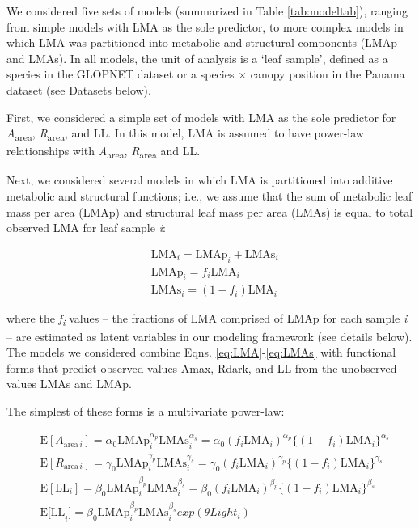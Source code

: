 \documentclass[
  12pt,
]{article}
\begin{document}
We considered five sets of models (summarized in Table \ref{tab:modeltab}), ranging from simple models with LMA as the sole predictor, to more complex models in which LMA was partitioned into metabolic and structural components (LMAp and LMAs).
In all models, the unit of analysis is a `leaf sample', defined as a species in the GLOPNET dataset or a species \(\times\) canopy position in the Panama dataset (see Datasets below).

First, we considered a simple set of models with LMA as the sole predictor for \emph{A}\textsubscript{area}, \emph{R}\textsubscript{area}, and LL.
In this model, LMA is assumed to have power-law relationships with \emph{A}\textsubscript{area}, \emph{R}\textsubscript{area} and LL.

Next, we considered several models in which LMA is partitioned into additive metabolic and structural functions; i.e., we assume that the sum of metabolic leaf mass per area (LMAp) and structural leaf mass per area (LMAs) is equal to total observed LMA for leaf sample \emph{i}:

\begin{align}
  &\mathrm{LMA}_{i} =\mathrm{LMAp}_{i} + \mathrm{LMAs}_{i} \label{eq:LMA}\\
  &\mathrm{LMAp}_{i} = f_{i} \mathrm{LMA}_{i} \label{eq:LMAp}\\
  &\mathrm{LMAs}_{i} = (1 - f_{i})  \mathrm{LMA}_{i}\label{eq:LMAs}
\end{align}

where the \emph{f\textsubscript{i}} values -- the fractions of LMA comprised of LMAp for each sample \emph{i} -- are estimated as latent variables in our modeling framework (see details below).
The models we considered combine Eqns. \eqref{eq:LMA}-\eqref{eq:LMAs} with functional forms that predict observed values Amax, Rdark, and LL from the unobserved values LMAs and LMAp.

The simplest of these forms is a multivariate power-law:

\begin{align}
& \mathrm{E}[A_{\mathrm{area} \, i}]
= \alpha_0\mathrm{LMAp}_{i}^{\alpha_p}\mathrm{LMAs}_i^{\alpha_s}  =  \alpha_0 (f_i \mathrm{LMA}_{i})^{\alpha_p} \bigl\{(1-f_i) \mathrm{LMA}_{i}\bigr\}^{\alpha_s} \label{eq:E-A} \\
& \mathrm{E}[R_{\mathrm{area} \, i}]
= \gamma_0\mathrm{LMAp}_{i}^{\gamma_p} \mathrm{LMAs}_{i}^{\gamma_s}
= \gamma_0 (f_i \mathrm{LMA}_{i})^{\gamma_p} \bigl\{(1-f_i)\mathrm{LMA}_{i}\bigr\}^{\gamma_s} \label{eq:E-R} \\
& \mathrm{E}[\mathrm{LL}_i] = \beta_0\mathrm{LMAp}_{i}^{\beta_p} \mathrm{LMAs}_{i}^{\beta_s}   = \beta_0 (f_i \mathrm{LMA}_{i})^{\beta_p} \bigl\{(1-f_i) \mathrm{LMA}_{i}\bigr\}^{\beta_s} \tag{6a}  \\
& \mathrm{E[LL}_i] = \beta_0\mathrm{LMAp}_{i}^{\beta_p} \mathrm{LMAs}_{i}^{\beta_s} exp(\theta Light_i) \tag{6b}
\end{align}
\end{document}
